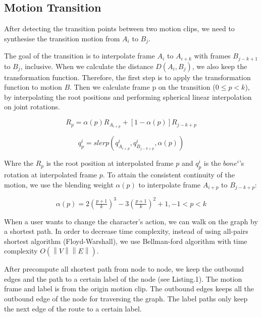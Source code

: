 \subsection{Motion Transition}
After detecting the transition points between two motion clips, we need to 
synthesise the transition motion from $A_i$ to $B_j$. 

The goal of the transition is to interpolate frame $A_i$ to $A_{i+k}$ with frames $B_{j-k+1}$ 
to $B_j$, inclusive. When we calculate the distance $D(A_i,B_j)$, we also keep 
the transformation function. Therefore, the first step is to apply the 
transformation function to motion $B$. 
Then we calculate frame p on the transition ($0\leqslant p < k$), by 
interpolating the root positions and performing spherical linear interpolation 
on joint rotations.

\begin {equation}
R_p  = \alpha(p)R_{A_{i+p}} + [1-\alpha(p)]R_{j-k+p}
\end {equation}

\begin {equation}
q^i_p = slerp(q^i_{A_{i+p}}, q^i_{B_{j-k+p}}, \alpha(p))
\end {equation}

Whre the $R_p$ is the root position at interpolated frame $p$ and $q^i_p$ is the 
$bone^i$'s rotation at interpolated frame $p$. To attain the consistent 
continuity of the motion, we use the blending weight $\alpha(p)$ to interpolate 
frame $A_{i+p}$ to $B_{j-k+p}$:

\begin {equation}
\alpha(p) = 2(\tfrac{p+1}{k})^3-3(\tfrac{p+1}{k})^2+1, -1<p<k
\end {equation}

When a user wants to change the character's action, we can walk on the graph by a shortest path. 
In order to decrease time complexity, instead of using all-pairs shortest algorithm 
(Floyd-Warshall), we use Bellman-ford algorithm with time complexity $O(\left \| V \right \| \left \| E \right \|)$.

After precompute all shortest path from node to node, we keep the outbound edges 
and the path to a certain label of the node (see Listing.1).
The motion frame and label is from the origin motion clip. The outbound edges 
keeps all the outbound edge of the node for traversing the graph. The label paths 
only keep the next edge of the route to a certain label. 

